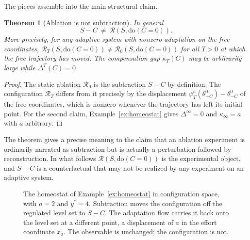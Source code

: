 \documentclass[11pt]{article}
\newtheorem{theorem}{Theorem}[section]
\theoremstyle{definition}
\theoremstyle{remark}
\newcommand{\Rop}{\mathcal{R}}
\newcommand{\dox}[1]{\mathrm{do}(#1)}
\begin{document}
The pieces assemble into the main structural claim.

\begin{theorem}[Ablation is not subtraction]\label{thm:notsub}
In general
\[
S-C\ \neq\ \Rop(S,\dox{C=0}).
\]
More precisely, for any adaptive system with nonzero adaptation on the free coordinates, $\Rop_T(S,\dox{C=0})\ne\Rop_0(S,\dox{C=0})$ for all $T>0$ at which the free trajectory has moved. The compensation gap $\kappa_T(C)$ may be arbitrarily large while $\Delta^T(C)=0$.
\end{theorem}
\begin{proof}
The static ablation $\Rop_0$ is the subtraction $S-C$ by definition. The configuration $\Rop_T$ differs from it precisely by the displacement $\psi^a_T(\theta^0_{-C})-\theta^0_{-C}$ of the free coordinates, which is nonzero whenever the trajectory has left its initial point. For the second claim, Example~\ref{ex:homeostat} gives $\Delta^\infty=0$ and $\kappa_\infty=a$ with $a$ arbitrary.
\end{proof}

The theorem gives a precise meaning to the claim that an ablation experiment is ordinarily narrated as subtraction but is actually a perturbation followed by reconstruction. In what follows $\Rop(S,\dox{C=0})$ is the experimental object, and $S-C$ is a counterfactual that may not be realized by any experiment on an adaptive system.


\begin{figure}[ht]
\centering
{}
\caption{The homeostat of Example~\ref{ex:homeostat} in configuration space, with $a=2$ and $y^*=4$. Subtraction moves the configuration off the regulated level set to $S-C$. The adaptation flow carries it back onto the level set at a different point, a displacement of $a$ in the effort coordinate $x_2$. The observable is unchanged; the configuration is not.}
\end{figure}
\end{document}
